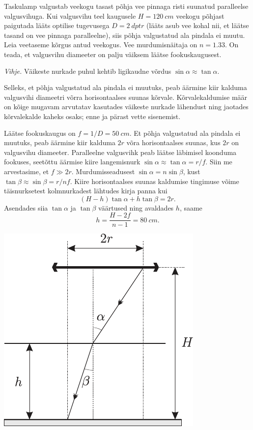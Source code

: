 
Taskulamp valgustab veekogu tasast põhja vee pinnaga risti suunatud paralleelse valgusvihuga. Kui valgusvihu teel kaugusele $H = \SI{120}{cm}$ veekogu põhjast paigutada lääts optilise tugevusega $D = \SI{2}{dptr}$ (lääts asub vee kohal nii, et läätse tasand on vee pinnaga paralleelne), siis põhja valgustatud ala pindala ei muutu. Leia veetaseme kõrgus antud veekogus. Vee murdumisnäitaja on $n = \num{1,33}$. On teada, et valgusvihu diameeter on palju väiksem läätse fookuskaugusest.

\emph{Vihje.} Väikeste nurkade puhul kehtib ligikaudne võrdus $\sin \alpha \approx \tan \alpha$.

\hint
Selleks, et põhja valgustatud ala pindala ei muutuks, peab äärmine kiir kalduma valgusvihi diameetri võrra horisontaalses suunas kõrvale. Kõrvalekaldumise määr on kõige mugavam arvutatav kasutades väikeste nurkade lähendust ning jaotades kõrvalekalde kaheks osaks; enne ja pärast vette sisenemist.

\solu

Läätse fookuskaugus on $f=1 / D=\SI{50}{cm}$. Et põhja valgustatud ala pindala ei muutuks, peab äärmine kiir kalduma $2 r$ võra horisontaalses suunas, kus $2 r$ on valgusvihu diameeter. Paralleelne valgusvihk peab läätse läbimisel koonduma fookuses, seetõttu äärmise kiire langemisnurk $\sin \alpha \approx \tan \alpha=r / f$. Siin me arvestasime, et $f \gg 2 r$. Murdumisseadusest $\sin \alpha=n \sin \beta$, kust $\tan \beta \approx \sin \beta=r / n f$. Kiire horisontaalses suunas
kaldumise tingimuse võime täisnurksetest kolmnurkadest lähtudes kirja panna kui
$$
(H-h) \tan \alpha+h \tan \beta=2 r.
$$
Asendades siia $\tan \alpha$ ja $\tan \beta$ väärtused ning avaldades $h$, saame
$$
h=\frac{H-2 f}{n-1}=\SI{80}{cm}.
$$
\begin{center}
	\includegraphics[width=0.5\linewidth]{2004-lahg-03-lah.pdf}
\end{center}

\probend